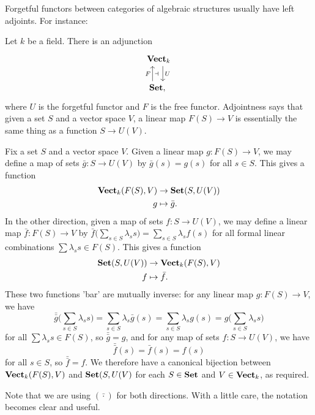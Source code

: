 \documentclass[11pt,a4paper]{article}
\begin{document}
\begin{example}
    Forgetful functors between categories of algebraic structures usually have left adjoints. For instance:
    \item Let $k$ be a field. There is an adjunction
        \begin{equation*}
        \begin{tikzcd}
            \bcat{Vect}_k \arrow[d, shift left=2, "U"] \\
            \bcat{Set,} \arrow[u, shift left=3, "F", "\dashv"'] \
        \end{tikzcd}
        \end{equation*}
    where $U$ is the forgetful functor and $F$ is the free functor. Adjointness says that given a set $S$ and a vector space $V$, a linear map $F(S)\to V$ is essentially the same thing as a function $S\to U(V)$.\par
    Fix a set $S$ and a vector space $V$. Given a linear map $g:F(S)\to V$, we may define a map of sets $\bar{g}: S\to U(V)$ by $\bar{g}(s)=g(s)$ for all $s\in S$. This gives a function
    \begin{align*}
    \mathbf{Vect}_k(F(S),V) &\to \mathbf{Set}(S,U(V))\\
        g &\mapsto \bar{g}.
    \end{align*}
    In the other direction, given a map of sets $f:S\to U(V)$, we may define a linear map $\bar{f}:F(S)\to V$ by $\bar{f}\Big( \sum_{s\in S}\lambda_s s\Big) =\sum_{s\in S}\lambda_sf(s)$ for all formal linear combinations $\sum \lambda_s s\in F(S)$. This gives a function
    \begin{align*}
        \mathbf{Set}(S, U(V)) &\to \mathbf{Vect}_k(F(S), V) \\
        f &\mapsto \bar{f}.
    \end{align*}
    These two functions 'bar' are mutually inverse: for any linear map $g:F(S)\to V$, we have
    $$\bar{\bar{g}}\Bigg( \sum\limits_{s\in S} \lambda_s s \Bigg) = \sum\limits_{s\in S} \lambda_s \bar{g}(s) = \sum\limits_{s\in S} \lambda_s g(s) = g\Bigg( \sum\limits_{s\in S} \lambda_s s \Bigg)$$
    for all $\sum \lambda_s s \in F(S)$, so $\bar{\bar{g}}=g$, and for any map of sets $f: S\to U(V)$, we have
    $$\bar{\bar{f}}(s)=\bar{f}(s)=f(s)$$
    for all $s\in S$, so $\bar{\bar{f}}=f$. We therefore have a canonical bijection between $\mathbf{Vect}_k(F(S), V)$ and $\mathbf{Set}(S, U(V)$ for each $S\in \mathbf{Set}$ and $V\in \mathbf{Vect}_k$, as required.
\end{example}
\begin{remark}
    Note that we are using $(\bar{\cdot})$ for both directions. With a little care, the notation becomes clear and useful.
\end{remark}
\end{document}
